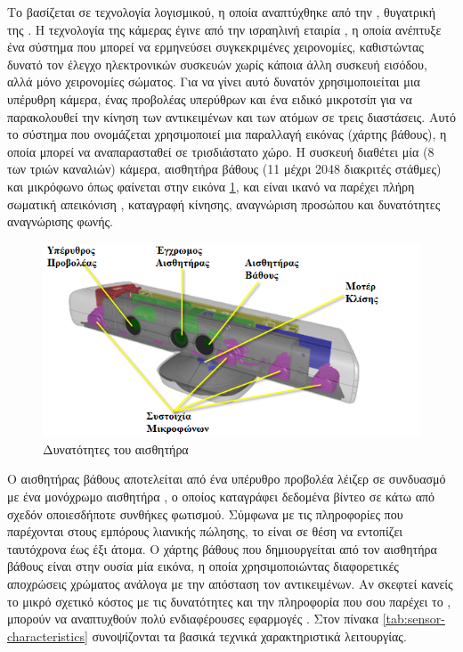 Το  βασίζεται σε τεχνολογία λογισμικού, η οποία αναπτύχθηκε από την , θυγατρική της . Η τεχνολογία της κάμερας έγινε από την ισραηλινή εταιρία , η οποία ανέπτυξε ένα σύστημα που μπορεί να ερμηνεύσει συγκεκριμένες χειρονομίες, καθιστώντας δυνατό τον έλεγχο ηλεκτρονικών συσκευών χωρίς κάποια άλλη συσκευή εισόδου, αλλά μόνο χειρονομίες σώματος. Για να γίνει αυτό δυνατόν χρησιμοποιείται μια υπέρυθρη κάμερα, ένας προβολέας υπερύθρων και ένα ειδικό μικροτσίπ για να παρακολουθεί την κίνηση των αντικειμένων και των ατόμων σε τρεις διαστάσεις. Αυτό το σύστημα  που ονομάζεται  χρησιμοποιεί μια παραλλαγή εικόνας (χάρτης βάθους), η οποία μπορεί να αναπαρασταθεί σε τρισδιάστατο χώρο. Η συσκευή διαθέτει μία  (8\- των τριών καναλιών) κάμερα, αισθητήρα βάθους (11\- μέχρι 2048 διακριτές στάθμες) και  μικρόφωνο όπως φαίνεται στην εικόνα \ref{fig:kinect-characteristics}, και είναι ικανό να παρέχει πλήρη σωματική απεικόνιση , καταγραφή κίνησης, αναγνώριση προσώπου και δυνατότητες αναγνώρισης φωνής.

\begin{figure}[H]
    \centering
    \includegraphics[width=.7\textwidth, keepaspectratio]{fig/kinect-characteristics.png}
    \caption{Δυνατότητες του αισθητήρα \protect\footnotemark}
    \label{fig:kinect-characteristics}
\end{figure}

Ο αισθητήρας βάθους αποτελείται από ένα υπέρυθρο προβολέα λέιζερ σε συνδυασμό με ένα μονόχρωμο αισθητήρα , ο οποίος καταγράφει δεδομένα βίντεο σε  κάτω από σχεδόν οποιεσδήποτε συνθήκες φωτισμού. Σύμφωνα με τις πληροφορίες που παρέχονται στους εμπόρους λιανικής πώλησης, το  είναι σε θέση να εντοπίζει ταυτόχρονα έως έξι άτομα. Ο χάρτης βάθους που δημιουργείται από τον αισθητήρα βάθους είναι στην ουσία μία εικόνα, η οποία χρησιμοποιώντας διαφορετικές αποχρώσεις χρώματος ανάλογα με την απόσταση τον αντικειμένων. Αν σκεφτεί κανείς το μικρό σχετικό κόστος με τις δυνατότητες και την πληροφορία που σου παρέχει το , μπορούν να αναπτυχθούν πολύ ενδιαφέρουσες εφαρμογές \cite{jean13}. Στον πίνακα \ref{tab:sensor-characteristics} συνοψίζονται τα βασικά τεχνικά χαρακτηριστικά λειτουργίας.

